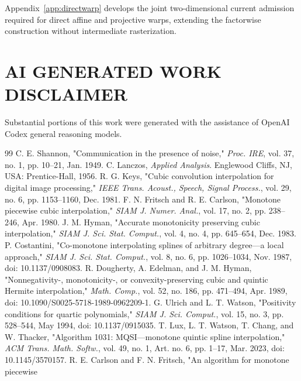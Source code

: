 \documentclass[journal]{IEEEtran}
\begin{document}
Appendix~\ref{app:directwarp} develops the joint two-dimensional current
admission required for direct affine and projective warps, extending the
factorwise construction without intermediate rasterization.




\section*{AI GENERATED WORK DISCLAIMER}

Substantial portions of this work were generated with the assistance of
OpenAI Codex general reasoning models.

\clearpage
\begin{thebibliography}{99}
\scriptsize
{}
C. E. Shannon, "Communication in the presence of noise," \emph{Proc. IRE},
vol. 37, no. 1, pp. 10--21, Jan. 1949.
C. Lanczos, \emph{Applied Analysis}. Englewood Cliffs, NJ, USA:
Prentice-Hall, 1956.
R. G. Keys, "Cubic convolution interpolation for digital image
processing," \emph{IEEE Trans. Acoust., Speech, Signal Process.}, vol. 29,
no. 6, pp. 1153--1160, Dec. 1981.
F. N. Fritsch and R. E. Carlson, "Monotone piecewise cubic interpolation,"
\emph{SIAM J. Numer. Anal.}, vol. 17, no. 2, pp. 238--246, Apr. 1980.
J. M. Hyman, "Accurate monotonicity preserving cubic interpolation,"
\emph{SIAM J. Sci. Stat. Comput.}, vol. 4, no. 4, pp. 645--654, Dec. 1983.
P. Costantini, "Co-monotone interpolating splines of arbitrary degree---a
local approach," \emph{SIAM J. Sci. Stat. Comput.}, vol. 8, no. 6,
pp. 1026--1034, Nov. 1987, doi: 10.1137/0908083.
R. Dougherty, A. Edelman, and J. M. Hyman, "Nonnegativity-,
monotonicity-, or convexity-preserving cubic and quintic Hermite
interpolation," \emph{Math. Comp.}, vol. 52, no. 186, pp. 471--494,
Apr. 1989, doi: 10.1090/S0025-5718-1989-0962209-1.
G. Ulrich and L. T. Watson, "Positivity conditions for quartic
polynomials," \emph{SIAM J. Sci. Comput.}, vol. 15, no. 3, pp. 528--544,
May 1994, doi: 10.1137/0915035.
T. Lux, L. T. Watson, T. Chang, and W. Thacker, "Algorithm 1031:
MQSI---monotone quintic spline interpolation," \emph{ACM Trans. Math.
Softw.}, vol. 49, no. 1, Art. no. 6, pp. 1--17, Mar. 2023,
doi: 10.1145/3570157.
R. E. Carlson and F. N. Fritsch, "An algorithm for monotone piecewise

\end{thebibliography}
\end{document}
